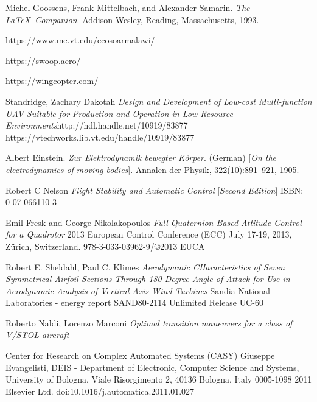 \documentclass{article}
\begin{document}

\newpage

\begin{thebibliography}{9}
Michel Goossens, Frank Mittelbach, and Alexander Samarin. 
\textit{The \LaTeX\ Companion}. 
Addison-Wesley, Reading, Massachusetts, 1993.

https://www.me.vt.edu/ecosoarmalawi/

https://swoop.aero/

https://wingcopter.com/

Standridge, Zachary Dakotah
\textit{Design and Development of Low-cost Multi-function UAV Suitable for Production and Operation in Low Resource Environments}http://hdl.handle.net/10919/83877
https://vtechworks.lib.vt.edu/handle/10919/83877


Albert Einstein. 
\textit{Zur Elektrodynamik bewegter K{\"o}rper}. (German) 
[\textit{On the electrodynamics of moving bodies}]. 
Annalen der Physik, 322(10):891–921, 1905.

Robert C Nelson
\textit{Flight Stability and Automatic Control}
[\textit{Second Edition}]
ISBN: 0-07-066110-3

Emil Fresk and George Nikolakopoulos
\textit{Full Quaternion Based Attitude Control for a Quadrotor}
2013 European Control Conference (ECC)
July 17-19, 2013, Zürich, Switzerland.
978-3-033-03962-9/©2013 EUCA

Robert E. Sheldahl, Paul C. Klimes
\textit{Aerodynamic CHaracteristics of Seven Symmetrical Airfoil Sections Through 180-Degree Angle of Attack for Use in Aerodynamic Analysis of Vertical Axis Wind Turbines}
Sandia National Laboratories - energy report
SAND80-2114 Unlimited Release UC-60

Roberto Naldi, Lorenzo Marconi
\textit{Optimal transition maneuvers for a class of V/STOL aircraft}

Center for Research on Complex Automated Systems (CASY) Giuseppe Evangelisti, DEIS - Department of Electronic, Computer Science and Systems, University of Bologna, Viale
Risorgimento 2, 40136 Bologna, Italy
0005-1098 
2011 Elsevier Ltd.
doi:10.1016/j.automatica.2011.01.027


\end{thebibliography}
\end{document}

